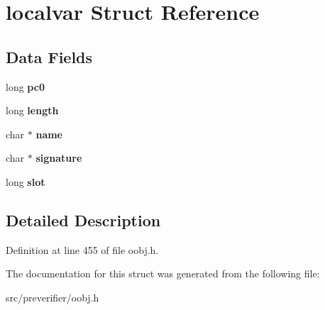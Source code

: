 \section{localvar Struct Reference}
\label{structlocalvar}
\subsection*{Data Fields}
\begin{DoxyCompactItemize}
\item 
long {\bfseries pc0}\label{structlocalvar_ad07c8439e601e994b40bf2f7fe696383}

\item 
long {\bfseries length}\label{structlocalvar_af90f6ffdd65eb6827e0a6623afa10f04}

\item 
char $\ast$ {\bfseries name}\label{structlocalvar_ae4a0b03981367ad672f1440c09fafef0}

\item 
char $\ast$ {\bfseries signature}\label{structlocalvar_a3dabb45659fa97baeffe7ff39bcc76dc}

\item 
long {\bfseries slot}\label{structlocalvar_a02dbc8848270d597b1b3f0a414597975}

\end{DoxyCompactItemize}


\subsection{Detailed Description}


Definition at line 455 of file oobj.h.



The documentation for this struct was generated from the following file:\begin{DoxyCompactItemize}
\item 
src/preverifier/oobj.h\end{DoxyCompactItemize}
